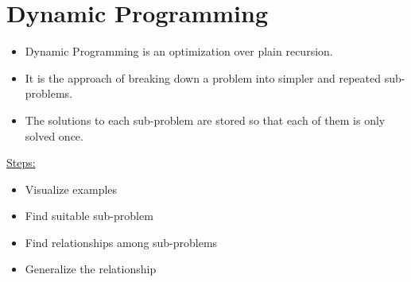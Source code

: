\section{Dynamic Programming}
\begin{itemize}
	\item Dynamic Programming is an optimization over plain recursion.
	\item It is the approach of breaking down a problem into simpler and repeated sub-problems.
	\item The solutions to each sub-problem are stored so that each of them is only solved once.
\end{itemize}

\href{https://youtu.be/aPQY__2H3tE}{Steps:}
\begin{itemize}
	\item Visualize examples
	\item Find suitable sub-problem
	\item Find relationships among sub-problems
	\item Generalize the relationship
\end{itemize}